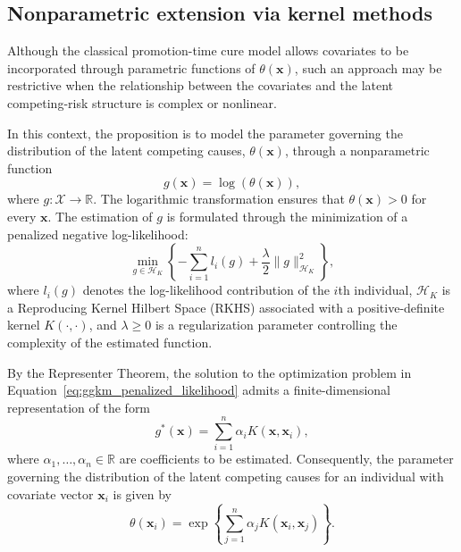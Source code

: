 \subsection{Nonparametric extension via kernel methods}

Although the classical promotion-time cure model allows covariates to be
incorporated through parametric functions of $\theta(\mathbf{x})$, such an
approach may be restrictive when the relationship between the covariates
and the latent competing-risk structure is complex or nonlinear.

In this context, the proposition is to model the parameter governing the
distribution of the latent competing causes, $\theta(\mathbf{x})$, through
a nonparametric function
\begin{equation}
g(\mathbf{x}) = \log\left(\theta(\mathbf{x})\right),
\end{equation}
where $g:\mathcal{X}\rightarrow\mathbb{R}$. The logarithmic
transformation ensures that $\theta(\mathbf{x})>0$ for every
$\mathbf{x}$. The estimation of $g$ is formulated through the minimization
of a penalized negative log-likelihood:
\begin{equation}
\label{eq:ggkm_penalized_likelihood}
\min_{g \in \mathcal{H}_K}
\left\{
-\sum_{i=1}^{n} l_i(g)
+
\frac{\lambda}{2}\|g\|_{\mathcal{H}_K}^{2}
\right\},
\end{equation}
where $l_i(g)$ denotes the log-likelihood contribution of the $i$th
individual, $\mathcal{H}_K$ is a Reproducing Kernel Hilbert Space (RKHS)
associated with a positive-definite kernel $K(\cdot,\cdot)$, and
$\lambda\geq 0$ is a regularization parameter controlling the complexity
of the estimated function.

By the Representer Theorem, the solution to the optimization problem in
Equation~\eqref{eq:ggkm_penalized_likelihood} admits a finite-dimensional
representation of the form
\begin{equation}
\label{eq:ggkm_representer}
g^*(\mathbf{x})
=
\sum_{i=1}^{n}\alpha_i K(\mathbf{x},\mathbf{x}_i),
\end{equation}
where $\alpha_1,\ldots,\alpha_n\in\mathbb{R}$ are coefficients to be
estimated. Consequently, the parameter governing the distribution of the
latent competing causes for an individual with covariate vector
$\mathbf{x}_i$ is given by
\begin{equation}
\label{eq:ggkm_theta}
\theta(\mathbf{x}_i)
=
\exp\left\{
\sum_{j=1}^{n}
\alpha_j K(\mathbf{x}_i,\mathbf{x}_j)
\right\}.
\end{equation}

